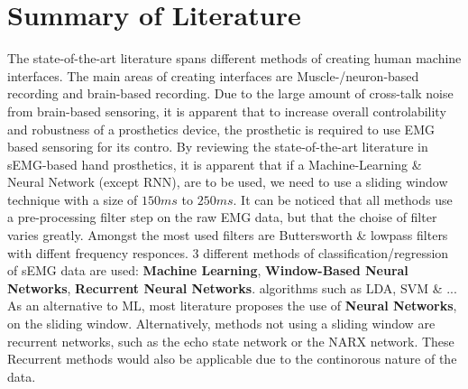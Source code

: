 \documentclass[../main.tex]{subfiles}
\begin{document}


\section{Summary of Literature}

The state-of-the-art literature spans different methods of creating human machine interfaces.
The main areas of creating interfaces are Muscle-/neuron-based recording and brain-based recording.
Due to the large amount of cross-talk noise from brain-based sensoring, it is apparent that to increase overall controlability and robustness of a prosthetics device, the prosthetic is required to use EMG based sensoring for its contro.
By reviewing the state-of-the-art literature in sEMG-based hand prosthetics, it is apparent that if a Machine-Learning \& Neural Network (except RNN), are to be used, we need to use a sliding window technique with a size of $150ms$ to $250ms$.
It can be noticed that all methods use a pre-processing filter step on the raw EMG data, but that the choise of filter varies greatly.
Amongst the most used filters are Buttersworth \& lowpass filters with diffent frequency responces.
3 different methods of classification/regression of sEMG data are used: \textbf{Machine Learning}, \textbf{Window-Based Neural Networks}, \textbf{Recurrent Neural Networks}.
algorithms such as LDA, SVM \& ...
As an alternative to ML, most literature proposes the use of \textbf{Neural Networks}, on the sliding window.
Alternatively, methods not using a sliding window are recurrent networks, such as the echo state network or the NARX network.
These Recurrent methods would also be applicable due to the continorous nature of the data.
\end{document}
